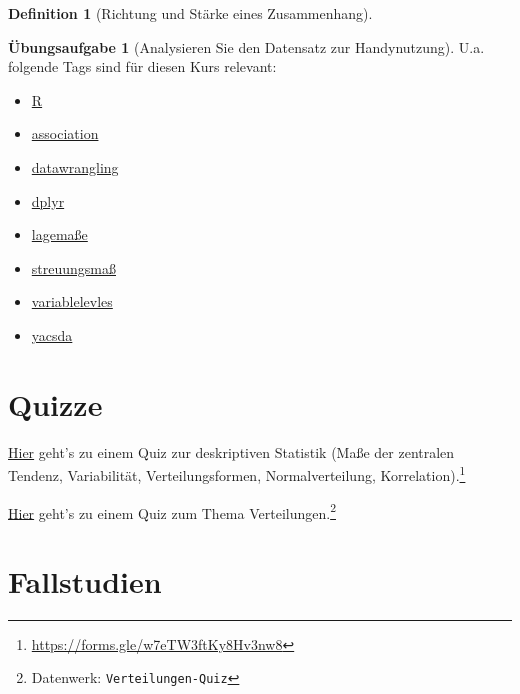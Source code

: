 \documentclass[
  a4paper,
  DIV=11]{scrreprt}
\providecommand{\tightlist}{%
  \setlength{\itemsep}{0pt}\setlength{\parskip}{0pt}}\usepackage{longtable,booktabs,array}
\theoremstyle{definition}
\newtheorem{exercise}{Übungsaufgabe}[chapter]
\theoremstyle{definition}
\theoremstyle{definition}
\newtheorem{definition}{Definition}[chapter]
\theoremstyle{remark}
\begin{document}
\begin{definition}[Richtung und Stärke eines
Zusammenhang]
\begin{exercise}[Analysieren Sie den Datensatz zur
Handynutzung]
U.a. folgende Tags sind für diesen Kurs relevant:

\begin{itemize}
\tightlist
\item
  \href{https://datenwerk.netlify.app/\#category=R}{R}
\item
  \href{https://datenwerk.netlify.app/\#category=association}{association}
\item
  \href{https://datenwerk.netlify.app/\#category=datawrangling}{datawrangling}
\item
  \href{https://datenwerk.netlify.app/\#category=dplyr}{dplyr}
\item
  \href{https://datenwerk.netlify.app/\#category=lagema\%C3\%9Fe}{lagemaße}
\item
  \href{https://datenwerk.netlify.app/\#category=streuungsma\%C3\%9F}{streuungsmaß}
\item
  \href{https://datenwerk.netlify.app/\#category=variable-levels}{variablelevles}
\item
  \href{https://datenwerk.netlify.app/\#category=yacsda}{yacsda}
\end{itemize}

\section{Quizze}\label{quizze}

\href{https://forms.gle/w7eTW3ftKy8Hv3nw8}{Hier} geht's zu einem Quiz
zur deskriptiven Statistik (Maße der zentralen Tendenz, Variabilität,
Verteilungsformen, Normalverteilung, Korrelation).\footnote{\url{https://forms.gle/w7eTW3ftKy8Hv3nw8}}

\href{https://datenwerk.netlify.app/\#category=Verteilungen-Quiz}{Hier}
geht's zu einem Quiz zum Thema Verteilungen.\footnote{Datenwerk:
  \texttt{Verteilungen-Quiz}}

\section{Fallstudien}\label{fallstudien-3}

\begin{tcolorbox}[enhanced jigsaw, leftrule=.75mm, opacitybacktitle=0.6, colback=white, colframe=quarto-callout-important-color-frame, coltitle=black, colbacktitle=quarto-callout-important-color!10!white, opacityback=0, left=2mm, breakable, titlerule=0mm, toptitle=1mm, bottomtitle=1mm, rightrule=.15mm, title=\textcolor{quarto-callout-important-color}{\faExclamation}\hspace{0.5em}{Wichtig}, arc=.35mm, bottomrule=.15mm, toprule=.15mm]


\end{tcolorbox}
\end{exercise}
\end{definition}
\end{document}
